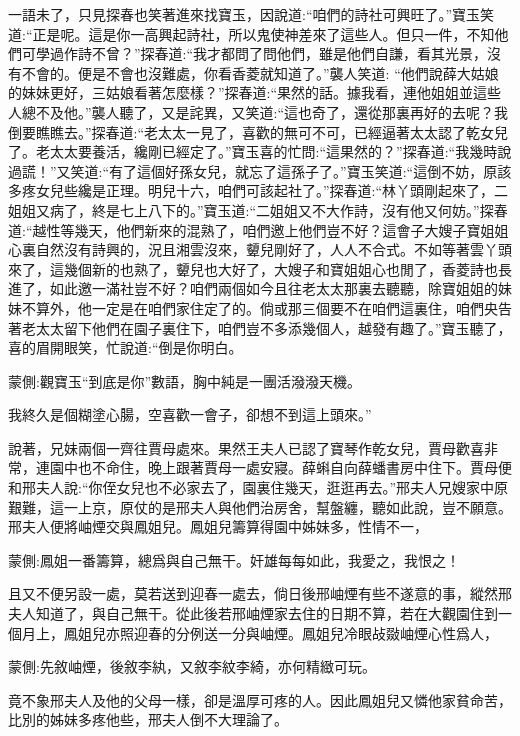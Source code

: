 \begin{parag}
    一語未了，只見探春也笑著進來找寶玉，因說道:“咱們的詩社可興旺了。”寶玉笑道:“正是呢。這是你一高興起詩社，所以鬼使神差來了這些人。但只一件，不知他們可學過作詩不曾？”探春道:“我才都問了問他們，雖是他們自謙，看其光景，沒有不會的。便是不會也沒難處，你看香菱就知道了。”襲人笑道: “他們說薛大姑娘的妹妹更好，三姑娘看著怎麼樣？”探春道:“果然的話。據我看，連他姐姐並這些人總不及他。”襲人聽了，又是詫異，又笑道:“這也奇了，還從那裏再好的去呢？我倒要瞧瞧去。”探春道:“老太太一見了，喜歡的無可不可，已經逼著太太認了乾女兒了。老太太要養活，纔剛已經定了。”寶玉喜的忙問:“這果然的？”探春道:“我幾時說過謊！”又笑道:“有了這個好孫女兒，就忘了這孫子了。”寶玉笑道:“這倒不妨，原該多疼女兒些纔是正理。明兒十六，咱們可該起社了。”探春道:“林丫頭剛起來了，二姐姐又病了，終是七上八下的。”寶玉道:“二姐姐又不大作詩，沒有他又何妨。”探春道:“越性等幾天，他們新來的混熟了，咱們邀上他們豈不好？這會子大嫂子寶姐姐心裏自然沒有詩興的，況且湘雲沒來，顰兒剛好了，人人不合式。不如等著雲丫頭來了，這幾個新的也熟了，顰兒也大好了，大嫂子和寶姐姐心也閒了，香菱詩也長進了，如此邀一滿社豈不好？咱們兩個如今且往老太太那裏去聽聽，除寶姐姐的妹妹不算外，他一定是在咱們家住定了的。倘或那三個要不在咱們這裏住，咱們央告著老太太留下他們在園子裏住下，咱們豈不多添幾個人，越發有趣了。”寶玉聽了，喜的眉開眼笑，忙說道:“倒是你明白。\begin{note}蒙側:觀寶玉“到底是你”數語，胸中純是一團活潑潑天機。\end{note}我終久是個糊塗心腸，空喜歡一會子，卻想不到這上頭來。”
\end{parag}


\begin{parag}
    說著，兄妹兩個一齊往賈母處來。果然王夫人已認了寶琴作乾女兒，賈母歡喜非常，連園中也不命住，晚上跟著賈母一處安寢。薛蝌自向薛蟠書房中住下。賈母便和邢夫人說:“你侄女兒也不必家去了，園裏住幾天，逛逛再去。”邢夫人兄嫂家中原艱難，這一上京，原仗的是邢夫人與他們治房舍，幫盤纏，聽如此說，豈不願意。邢夫人便將岫煙交與鳳姐兒。鳳姐兒籌算得園中姊妹多，性情不一，\begin{note}蒙側:鳳姐一番籌算，總爲與自己無干。奸雄每每如此，我愛之，我恨之！\end{note}且又不便另設一處，莫若送到迎春一處去，倘日後邢岫煙有些不遂意的事，縱然邢夫人知道了，與自己無干。從此後若邢岫煙家去住的日期不算，若在大觀園住到一個月上，鳳姐兒亦照迎春的分例送一分與岫煙。鳳姐兒冷眼敁敠岫煙心性爲人，\begin{note}蒙側:先敘岫煙，後敘李紈，又敘李紋李綺，亦何精緻可玩。\end{note}竟不象邢夫人及他的父母一樣，卻是溫厚可疼的人。因此鳳姐兒又憐他家貧命苦，比別的姊妹多疼他些，邢夫人倒不大理論了。
\end{parag}


